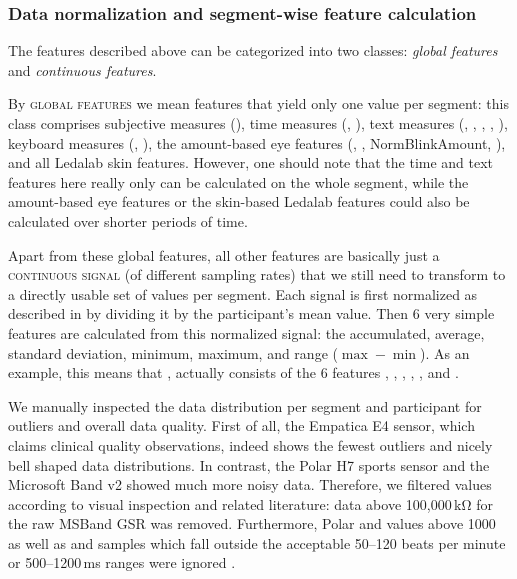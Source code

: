 \documentclass[output=paper]{langsci/langscibook}
\begin{document}

\subsubsection{Data normalization and segment-wise feature calculation}
\label{sec:datanorm}
The features described above can be categorized into two classes: \textit{global features} and \textit{continuous features}.

By \textsc{global features} we mean features that yield only one value per segment: this class comprises subjective measures (\subjCL{}), time measures (\petime{}, \lnpetime{}), text measures (\bleu{}, \hbleu{}, \ter{}, \hter{}, \sentencelength{}), keyboard measures (\apr{}, \pwr{}), the amount-based eye features (\blinkamount{}, \fixamount{}, Norm\-Blink\-Amount, \normfixamount{}), and all Ledalab skin features. However, one should note that the time and text features here really only can be calculated on the whole segment, while the amount-based eye features or the skin-based Ledalab features could also be calculated over shorter periods of time.

Apart from these global features, all other features are basically just a \textsc{continuous signal} (of different sampling rates) that we still need to transform to a directly usable set of values per segment.
Each signal is first normalized as described in \cite{chen2016robust} by dividing it by the participant's mean value. Then 6 very simple features are calculated from this normalized signal: the accumulated, average, standard deviation, minimum, maximum, and range ($\max - \min$). As an example, this means that \gsr{}{}, actually consists of the 6 features , , , , , and .

We manually inspected the data distribution per segment and participant for outliers and overall data quality. First of all, the Empatica E4 sensor, which claims clinical quality observations, indeed shows the fewest outliers and nicely bell shaped data distributions. In contrast, the Polar H7 sports sensor and the Microsoft Band v2 showed much more noisy data. Therefore, we filtered values according to visual inspection and related literature: data above 100,000\,kΩ for the raw MSBand GSR was removed. Furthermore, Polar \rmssd{}{} and \sdnn{}{} values above 1000 \citep{van2018normal} as well as  and  samples which fall outside the acceptable 50--120 beats per minute or 500--1200\,ms ranges were ignored \citep{shaffer2017overview}.
\end{document}
